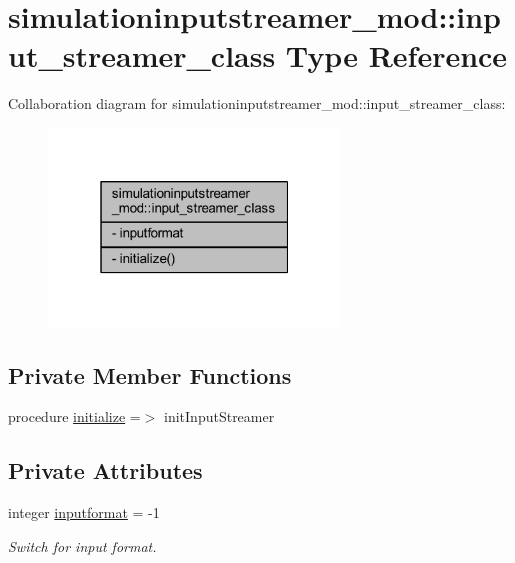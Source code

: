 \hypertarget{structsimulationinputstreamer__mod_1_1input__streamer__class}{}\section{simulationinputstreamer\+\_\+mod\+:\+:input\+\_\+streamer\+\_\+class Type Reference}
\label{structsimulationinputstreamer__mod_1_1input__streamer__class}


Collaboration diagram for simulationinputstreamer\+\_\+mod\+:\+:input\+\_\+streamer\+\_\+class\+:\nopagebreak
\begin{figure}[H]
\begin{center}
\leavevmode
\includegraphics[width=220pt]{structsimulationinputstreamer__mod_1_1input__streamer__class__coll__graph}
\end{center}
\end{figure}
\subsection*{Private Member Functions}
\begin{DoxyCompactItemize}
\item 
procedure \mbox{\hyperlink{structsimulationinputstreamer__mod_1_1input__streamer__class_a52470b6d47f3ce270f9fdc14ccfa25d5}{initialize}} =$>$ init\+Input\+Streamer
\end{DoxyCompactItemize}
\subsection*{Private Attributes}
\begin{DoxyCompactItemize}
\item 
integer \mbox{\hyperlink{structsimulationinputstreamer__mod_1_1input__streamer__class_ad033c61e1678bef91313cdccddde15ad}{inputformat}} = -\/1
\begin{DoxyCompactList}\small\item\em Switch for input format. \end{DoxyCompactList}\end{DoxyCompactItemize}


